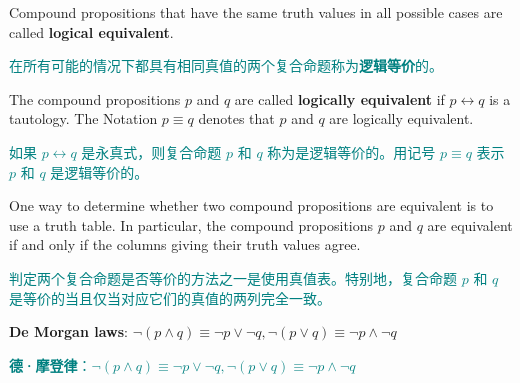 \documentclass[12pt, a4paper]{article} %
\begin{document}
Compound propositions that have the same truth values in all possible cases are called \textbf{logical equivalent}.

\textcolor{teal}{
    在所有可能的情况下都具有相同真值的两个复合命题称为\textbf{逻辑等价}的。
}

\begin{definition}
    The compound propositions $p$ and $q$ are called \textbf{logically equivalent} if $p \leftrightarrow q$ is a tautology.
    The Notation $p \equiv q$ denotes that $p$ and $q$ are logically equivalent.
\end{definition}

\begin{theorem}
    \textcolor{teal}{
        如果 $p \leftrightarrow q$ 是永真式，则复合命题 $p$ 和 $q$ 称为是逻辑等价的。用记号 $p \equiv q$ 表示 $p$ 和 $q$ 是逻辑等价的。
    }
\end{theorem}

One way to determine whether two compound propositions are equivalent is to use a truth table. In particular, the compound propositions $p$ and $q$ are equivalent if and only if the columns giving their truth values agree.

\textcolor{teal}{
    判定两个复合命题是否等价的方法之一是使用真值表。特别地，复合命题 $p$ 和 $q$ 是等价的当且仅当对应它们的真值的两列完全一致。
}

\textbf{De Morgan laws}: $\neg (p \wedge q) \equiv \neg p \vee \neg q, \neg (p \vee q) \equiv \neg p \wedge \neg q$

\textcolor{teal}{
    \textbf{德·摩登律}：$\neg (p \wedge q) \equiv \neg p \vee \neg q, \neg (p \vee q) \equiv \neg p \wedge \neg q$
}
\end{document}
